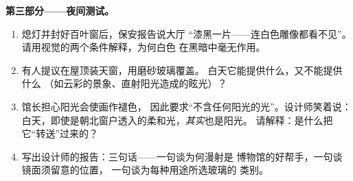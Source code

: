 \begin{problem}
\medskip\noindent\textbf{第三部分——夜间测试。}
\begin{enumerate}[resume]
  \item 熄灯并封好百叶窗后，保安报告说大厅
        “漆黑一片——连白色雕像都看不见”。
        请用视觉的两个条件解释，为何白色
        在黑暗中毫无作用。
  \item 有人提议在屋顶装天窗，用磨砂玻璃覆盖。
        白天它能提供什么，又不能提供什么
        （如云彩的景象、直射阳光造成的眩光）？
  \item 馆长担心阳光会使画作褪色，
        因此要求“不含任何阳光的光”。设计师笑着说：
        白天，即使是朝北窗户透入的柔和光，\emph{其实}也是阳光。
        请解释：是什么把它“转送”过来的？
  \item 写出设计师的报告：三句话——一句谈为何漫射是
        博物馆的好帮手，一句谈镜面须留意的位置，
        一句谈为每种用途所选玻璃的
        类别。
\end{enumerate}
\end{problem}
